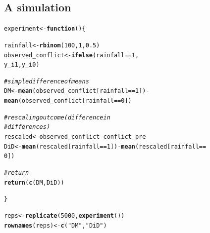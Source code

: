 \documentclass[12 pt]{article}\usepackage[]{graphicx}\usepackage[]{color}
\makeatletter
\newcommand{\hlnum}[1]{\textcolor[rgb]{0.686,0.059,0.569}{#1}}%
\newcommand{\hlstr}[1]{\textcolor[rgb]{0.192,0.494,0.8}{#1}}%
\newcommand{\hlcom}[1]{\textcolor[rgb]{0.678,0.584,0.686}{\textit{#1}}}%
\newcommand{\hlopt}[1]{\textcolor[rgb]{0,0,0}{#1}}%
\newcommand{\hlstd}[1]{\textcolor[rgb]{0.345,0.345,0.345}{#1}}%
\newcommand{\hlkwa}[1]{\textcolor[rgb]{0.161,0.373,0.58}{\textbf{#1}}}%
\newcommand{\hlkwb}[1]{\textcolor[rgb]{0.69,0.353,0.396}{#1}}%
\newcommand{\hlkwd}[1]{\textcolor[rgb]{0.737,0.353,0.396}{\textbf{#1}}}%
\newenvironment{kframe}{%
 \def\at@end@of@kframe{}%
 \ifinner\ifhmode%
  \def\at@end@of@kframe{\end{minipage}}%
  \begin{minipage}{\columnwidth}%
 \fi\fi%
 \def\FrameCommand##1{\hskip\@totalleftmargin \hskip-\fboxsep
 \colorbox{shadecolor}{##1}\hskip-\fboxsep
     \hskip-\linewidth \hskip-\@totalleftmargin \hskip\columnwidth}%
 \MakeFramed {\advance\hsize-\width
   \@totalleftmargin\z@ \linewidth\hsize
   \@setminipage}}%
 {\par\unskip\endMakeFramed%
 \at@end@of@kframe}
\newenvironment{knitrout}{}{} %
\makeatother
\begin{document}
\subsection*{A simulation}
\begin{knitrout}
\color{fgcolor}\begin{kframe}
\begin{alltt}
\hlstd{experiment} \hlkwb{<-} \hlkwa{function}\hlstd{() \{}

    \hlstd{rainfall} \hlkwb{<-} \hlkwd{rbinom}\hlstd{(}\hlnum{100}\hlstd{,} \hlnum{1}\hlstd{,} \hlnum{0.5}\hlstd{)}
    \hlstd{observed_conflict} \hlkwb{<-} \hlkwd{ifelse}\hlstd{(rainfall} \hlopt{==} \hlnum{1}\hlstd{,}
        \hlstd{y_i1, y_i0)}

    \hlcom{# simple difference of means}
    \hlstd{DM} \hlkwb{<-} \hlkwd{mean}\hlstd{(observed_conflict[rainfall} \hlopt{==} \hlnum{1}\hlstd{])} \hlopt{-}
        \hlkwd{mean}\hlstd{(observed_conflict[rainfall} \hlopt{==} \hlnum{0}\hlstd{])}

    \hlcom{# rescaling outcome (difference in}
    \hlcom{# differences)}
    \hlstd{rescaled} \hlkwb{<-} \hlstd{observed_conflict} \hlopt{-} \hlstd{conflict_pre}
    \hlstd{DiD} \hlkwb{<-} \hlkwd{mean}\hlstd{(rescaled[rainfall} \hlopt{==} \hlnum{1}\hlstd{])} \hlopt{-} \hlkwd{mean}\hlstd{(rescaled[rainfall} \hlopt{==}
        \hlnum{0}\hlstd{])}

    \hlcom{# return}
    \hlkwd{return}\hlstd{(}\hlkwd{c}\hlstd{(DM, DiD))}

\hlstd{\}}


\hlstd{reps} \hlkwb{<-} \hlkwd{replicate}\hlstd{(}\hlnum{5000}\hlstd{,} \hlkwd{experiment}\hlstd{())}
\hlkwd{rownames}\hlstd{(reps)} \hlkwb{<-} \hlkwd{c}\hlstd{(}\hlstr{"DM"}\hlstd{,} \hlstr{"DiD"}\hlstd{)}
\end{alltt}
\end{kframe}
\end{knitrout}
\end{document}
